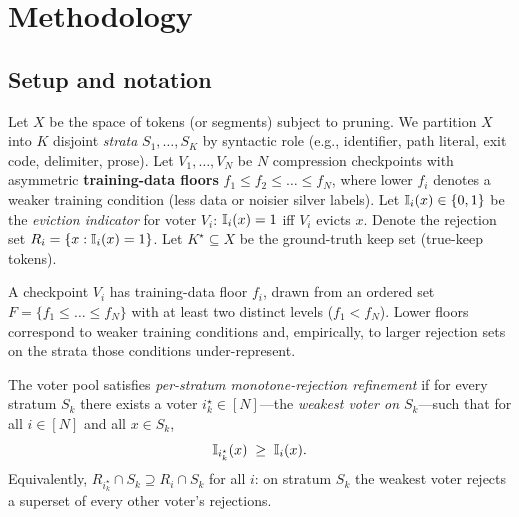 \section{Methodology}
\label{sec:methodology}

\subsection{Setup and notation}
\label{sec:setup}

Let $X$ be the space of tokens (or segments) subject to pruning. We partition
$X$ into $K$ disjoint \emph{strata} $S_1,\dots,S_K$ by syntactic role
(e.g., identifier, path literal, exit code, delimiter, prose). Let
$V_1,\dots,V_N$ be $N$ compression checkpoints with asymmetric
\textbf{training-data floors} $f_1 \le f_2 \le \dots \le f_N$, where lower $f_i$
denotes a weaker training condition (less data or noisier silver labels).
Let $\mathbb{I}_i(x) \in \{0,1\}$ be the \emph{eviction indicator} for voter $V_i$:
$\mathbb{I}_i(x)=1$ iff $V_i$ evicts $x$. Denote the rejection set
$R_i = \{x : \mathbb{I}_i(x)=1\}$. Let $K^{\star}\subseteq X$ be the ground-truth
keep set (true-keep tokens).

\begin{definition}
\label{def:floor}
A checkpoint $V_i$ has training-data floor $f_i$, drawn from an ordered set
$F=\{f_1\le\dots\le f_N\}$ with at least two distinct levels ($f_1 < f_N$).
Lower floors correspond to weaker training conditions and, empirically, to
larger rejection sets on the strata those conditions under-represent.
\end{definition}

\begin{definition}
\label{def:monotone}
The voter pool satisfies \emph{per-stratum monotone-rejection refinement} if
for every stratum $S_k$ there exists a voter $i^{\star}_k \in [N]$---the
\emph{weakest voter on $S_k$}---such that for all $i \in [N]$ and all
$x \in S_k$,
\[
  \mathbb{I}_{i^{\star}_k}(x) \;\ge\; \mathbb{I}_i(x).
\]
Equivalently, $R_{i^{\star}_k} \cap S_k \supseteq R_i \cap S_k$ for all $i$:
on stratum $S_k$ the weakest voter rejects a superset of every other voter's
rejections.
\end{definition}

